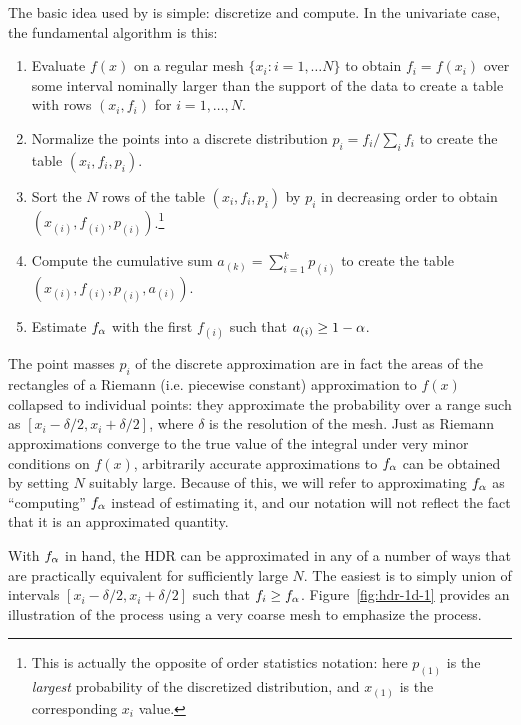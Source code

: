 
The basic idea used by  is simple: discretize and compute. In the univariate case, the fundamental algorithm is this:
\begin{enumerate}
\item Evaluate $f(x)$ on a regular mesh $\{x_{i}: i = 1, \ldots N\}$ to obtain $f_{i} = f(x_{i})$ over some interval nominally larger than the support of the data to create a table with rows $(x_{i}, f_{i})$ for $i = 1, \ldots, N$.
\item Normalize the points into a discrete distribution $p_{i} = f_{i} / \sum_{i}f_{i}$ to create the table $(x_{i}, f_{i}, p_{i})$.
\item Sort the $N$ rows of the table $(x_{i}, f_{i}, p_{i})$ by $p_{i}$ in decreasing order to obtain $(x_{(i)}, f_{(i)}, p_{(i)})$.\footnote{This is actually the opposite of order statistics notation: here $p_{(1)}$ is the \emph{largest} probability of the discretized distribution, and $x_{(1)}$ is the corresponding $x_{i}$ value.}
\item Compute the cumulative sum $a_{(k)} = \sum_{i=1}^{k} p_{(i)}$  to create the table $(x_{(i)}, f_{(i)}, p_{(i)}, a_{(i)})$.
\item Estimate $f_{\alpha}$ with the first $f_{(i)}$ such that $a_{(i)} \geq 1 - \alpha$.
\end{enumerate}
The point masses $p_{i}$ of the discrete approximation are in fact the areas of the rectangles of a Riemann (i.e. piecewise constant) approximation to $f(x)$ collapsed to individual points: they approximate the probability over a range such as $[x_{i}-\delta/2, x_{i}+\delta/2]$, where $\delta$ is the resolution of the mesh. Just as Riemann approximations converge to the true value of the integral under very minor conditions on $f(x)$, arbitrarily accurate approximations to $f_{\alpha}$ can be obtained by setting $N$ suitably large. Because of this, we will refer to approximating $f_{\alpha}$ as ``computing'' $f_{\alpha}$ instead of estimating it, and our notation will not reflect the fact that it is an approximated quantity.

With $f_{\alpha}$ in hand, the HDR can be approximated in any of a number of ways that are practically equivalent for sufficiently large $N$. The easiest is to simply union of intervals $[x_{i}-\delta/2, x_{i}+\delta/2]$ such that $f_{i} \geq f_{\alpha}$. Figure~\ref{fig:hdr-1d-1} provides an illustration of the process using a very coarse mesh to emphasize the process.

